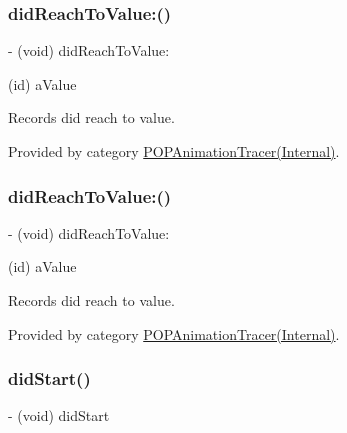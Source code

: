 \subsubsection{\texorpdfstring{did\+Reach\+To\+Value\+:()}{didReachToValue:()}\hspace{0.1cm}{\footnotesize\ttfamily [1/2]}}
{\footnotesize\ttfamily -\/ (void) did\+Reach\+To\+Value\+: \begin{DoxyParamCaption}\item[{(id)}]{a\+Value }\end{DoxyParamCaption}}

Records did reach to value. 

Provided by category \mbox{\hyperlink{category_p_o_p_animation_tracer_07_internal_08_a03287c5af7d17de6143c7dcc0ac56251}{P\+O\+P\+Animation\+Tracer(\+Internal)}}.

\mbox{\label{interface_p_o_p_animation_tracer_a03287c5af7d17de6143c7dcc0ac56251}} 
\subsubsection{\texorpdfstring{did\+Reach\+To\+Value\+:()}{didReachToValue:()}\hspace{0.1cm}{\footnotesize\ttfamily [2/2]}}
{\footnotesize\ttfamily -\/ (void) did\+Reach\+To\+Value\+: \begin{DoxyParamCaption}\item[{(id)}]{a\+Value }\end{DoxyParamCaption}}

Records did reach to value. 

Provided by category \mbox{\hyperlink{category_p_o_p_animation_tracer_07_internal_08_a03287c5af7d17de6143c7dcc0ac56251}{P\+O\+P\+Animation\+Tracer(\+Internal)}}.

\mbox{\label{interface_p_o_p_animation_tracer_a91b472c0e05c912fe9d05e2e9de17f9f}} 
\subsubsection{\texorpdfstring{did\+Start()}{didStart()}\hspace{0.1cm}{\footnotesize\ttfamily [1/2]}}
{\footnotesize\ttfamily -\/ (void) did\+Start \begin{DoxyParamCaption}{ }\end{DoxyParamCaption}}


